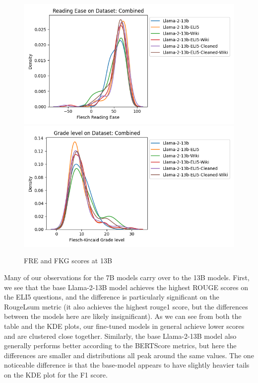 \documentclass[11pt, oneside]{article}   	%
\begin{document}
\begin{figure}
\\
\includegraphics[scale=.5]{./figures/FRE_13B_full.png}
\includegraphics[scale=.5]{./figures/FKG_13B_full.png}
\caption{FRE and FKG scores at 13B}
\label{fig:FRE_FKG_13B}
\end{figure}

Many of our observations for the 7B models carry over to the 13B models. 
First, we see that the base Llama-2-13B model achieves the highest ROUGE scores on the ELI5 questions, and the difference is particularly significant on the RougeLsum metric (it also achieves the highest rouge1 score, but the differences between the models here are likely insignificant).
As we can see from both the table and the KDE plots, our fine-tuned models in general achieve lower scores and are clustered close together.
Similarly, the base Llama-2-13B model also generally performs better according to the BERTScore metrics, but here the differences are smaller and distributions all peak around the same values.
The one noticeable difference is that the base-model appears to have slightly heavier tails on the KDE plot for the F1 score.
\end{document}
